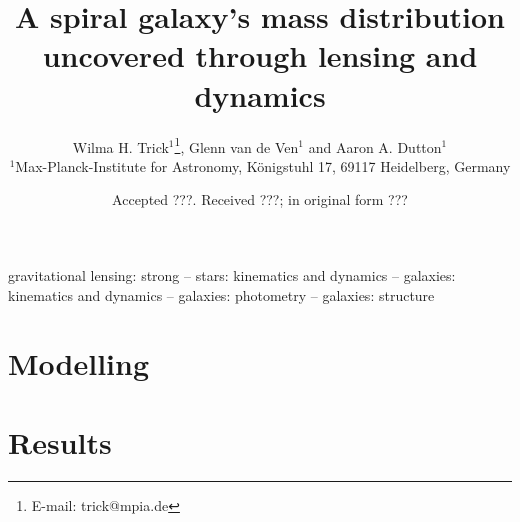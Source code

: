 \documentclass[useAMS,usenatbib]{mnras}
\title[A spiral galaxy's mass distribution uncovered]{A spiral galaxy's mass distribution uncovered through lensing and dynamics}
\author[W. H. Trick, G. van de Ven and A. A. Dutton]{Wilma H. Trick$^{1}$\thanks{E-mail:
trick@mpia.de}, Glenn van de Ven$^{1}$ and Aaron A. Dutton$^{1}$\\
$^{1}$Max-Planck-Institute for Astronomy, K\"{o}nigstuhl 17, 69117 Heidelberg, Germany}
\begin{document}
\date{Accepted ???. Received ???; in original form ???}

\pagerange{\pageref{firstpage}--\pageref{lastpage}} 

\maketitle

\label{firstpage}

\begin{abstract}
\end{abstract}

\begin{keywords}
gravitational lensing: strong -- stars: kinematics and dynamics -- galaxies: kinematics and dynamics -- galaxies: photometry -- galaxies: structure
\end{keywords}



\section{Modelling} \label{sec:Modelling}

\section{Results} \label{sec:Results}
\end{document}
